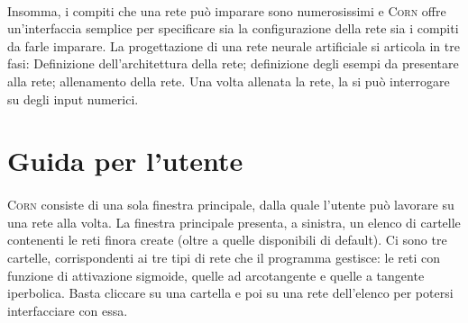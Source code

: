 \documentclass[12pt]{article}
\begin{document}
\paragraph{} Insomma, i compiti che una rete può imparare sono numerosissimi e \textsc{Corn} offre un'interfaccia semplice per specificare sia la configurazione della rete sia i compiti da farle imparare. La progettazione di una rete neurale artificiale si articola in tre fasi: Definizione dell'architettura della rete; definizione degli esempi da presentare alla rete; allenamento della rete. Una volta allenata la rete, la si può interrogare su degli input numerici.




\section{Guida per l'utente}

\paragraph{} \textsc{Corn} consiste di una sola finestra principale, dalla quale l'utente può lavorare su una rete alla volta. La finestra principale presenta, a sinistra, un elenco di cartelle contenenti le reti finora create (oltre a quelle disponibili di default). Ci sono tre cartelle, corrispondenti ai tre tipi di rete che il programma gestisce: le reti con funzione di attivazione sigmoide, quelle ad arcotangente e quelle a tangente iperbolica. Basta cliccare su una cartella e poi su una rete dell'elenco per potersi interfacciare con essa.
\end{document}
